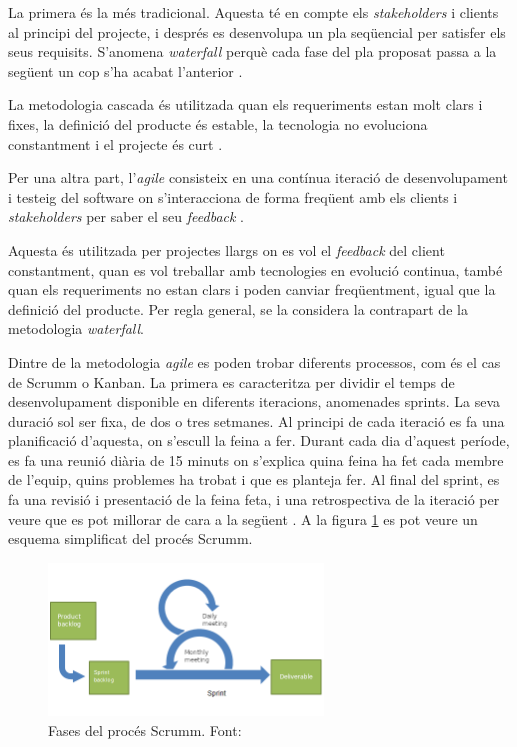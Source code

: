 \documentclass[a4paper]{article}
\begin{document}
La primera és la més tradicional. Aquesta té en compte els \textit{stakeholders} i clients al principi del projecte, i després es desenvolupa un pla seqüencial per satisfer els seus requisits. S'anomena \textit{waterfall} perquè cada fase del pla proposat passa a la següent un cop s'ha acabat l'anterior \cite{waterfallModel}.

La metodologia cascada és utilitzada quan els requeriments estan molt clars i fixes, la definició del producte és estable, la tecnologia no evoluciona constantment i el projecte és curt \cite{waterfallTutorialsPoint}.

Per una altra part, l'\textit{agile} consisteix en una contínua iteració de desenvolupament i testeig del software on s'interacciona de forma freqüent amb els clients i \textit{stakeholders} per saber el seu \textit{feedback} \cite{agileVsWaterfall}.

Aquesta és utilitzada per projectes llargs on es vol el \textit{feedback} del client constantment, quan es vol treballar amb tecnologies en evolució continua, també quan els requeriments no estan clars i poden canviar freqüentment, igual que la definició del producte. Per regla general, se la considera la contrapart de la metodologia \textit{waterfall}. 

Dintre de la metodologia \textit{agile} es poden trobar diferents processos, com és el cas de Scrumm o Kanban. La primera es caracteritza per dividir el temps de desenvolupament disponible en diferents iteracions, anomenades sprints. La seva duració sol ser fixa,  de dos o tres setmanes. Al principi de cada iteració es fa una planificació d'aquesta, on s'escull la feina a fer. Durant cada dia d'aquest període, es fa una reunió diària de 15 minuts on s'explica quina feina ha fet cada membre de l'equip, quins problemes ha trobat i que es planteja fer. Al final del sprint, es fa una revisió i presentació de la feina feta, i una retrospectiva de la iteració per veure que es pot millorar de cara a la següent \cite{wikipediaScrum}. A la figura \ref{fig:ScrummImage} es pot veure un esquema simplificat del procés Scrumm.

\begin{figure}[H]
    \centering
    \includegraphics[width=0.65\textwidth]{images/Scrumm.png}
    \caption{Fases del procés Scrumm. Font: \cite{wikipediaScrum}}
    \label{fig:ScrummImage}
\end{figure}
\end{document}
